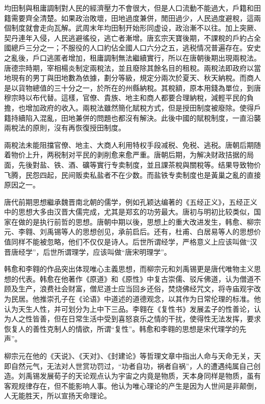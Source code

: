 均田制與租庸調制對人民的經濟壓力不會很大，但是人口流動不能過大，戶籍和田籍需要齊全清楚。如果政治敗壞，田地過度兼併，閒田過少，人民過度避稅，這兩個制度就會走向瓦解。武周末年均田制开始形同虚设，政治漸不以往。加上突厥、契丹連年入侵，人民逃避徭役，逃亡者漸增。唐玄宗天寶後期，不課稅的戶約占全國總戶三分之一；不服役的人口約佔全國人口六分之五，逃税情况普遍存在。安史之亂後，戶口逃匿者增加，租庸調制無法繼續實行，所以在唐朝後期出現兩稅法。唐德宗時期，宰相楊炎制定兩稅法，並且廢除其餘名目的租稅。兩稅法即政府以當地現有的男丁與田地數為依據，劃分等級，規定分兩次於夏天、秋天納稅。而商人是以貨物總值的三十分之一，於所在的州縣納稅。其稅額，原本用錢為單位，到唐穆宗時以布代替。這樣，官僚、貴族、地主和商人都要合理納稅，減輕平民的負擔，也增加政府的收入。兩稅法雖然簡化賦稅方式，但是授田制度被廢除。使得戶籍持續陷入混亂，田地兼併的問題也都沒有解決。此後中國的賦稅制度，一直沿襲兩稅法的原則，沒有再恢復授田制度。

兩稅法未能阻擋官僚、地主、大商人利用特权手段减税、免税、逃税。唐朝后期随着物价上升，两税制对平民的剥削愈来愈严重。唐朝后期，为解决财政拮据的局面，先後對盐、铁、酒、礦等實行专卖制度，並且課茶稅與關稅等。结果导致物价飞腾，民怨四起，民间贩卖私盐者不在少数。而盐铁专卖制度也是黃巢之亂的直接原因之一。

唐代前期思想繼承魏晋南北朝的儒学，例如孔颖达编著的《五经正义》，五经正义中的思想大多由汉晋大儒完成，尤其是郑玄的功劳最大。唐初与明初比较类似，国家在做的是执行前哲的思想。唐朝中期以後，思想上的重大改进发生，韩愈、柳宗元、李翱、刘禹锡等人的思想创见，承前启后。还有，杜甫、白居易等人的思想价值同样不能被忽略，他们不仅仅是诗人。后世所谓经学，严格意义上应该叫做“汉晋唐经学”，后世所谓理学，应该叫做“唐宋明理学”。

韩愈和李翱的作品突出体现唯心主義思想，而柳宗元和刘禹锡更是唐代唯物主义思想的代表。韩愈在他著作《原道》和《原性》中复古崇儒、驳斥佛道，认为僧道不顾及生产，浪费社会财富，僧尼道士应当回乡还俗，焚烧佛经咒文，将寺庙观宇改为民居。他推崇孔子在《论语》中道述的道德观念，以其作为日常伦理的标准。他认为天生人性，并可划分为上中下三品。李翱在《复性书》发展孟子的性善论，认为人之性皆善，但在日常生活中受到喜怒哀乐之情的干扰，使得性无法发挥，要求恢复人的善性克制人的情欲，所谓“复性”。韩愈和李翱的思想是宋代理学的先声”。

柳宗元在他的《天说》、《天对》、《封建论》等哲理文章中指出人命与天命无关，天即自然元气，无法对人世赏功罚过，“功者自功，祸者自祸”，人的遭遇纯属自己创造。刘禹锡发展荀子的天论观点认为宇宙之内竟是物质，天本身同样是物质，虽有客观规律存在，但不能影响人事。他认为唯心理论的产生是因为人世间是非颠倒，人无能胜天，所以宣扬天命理论。

